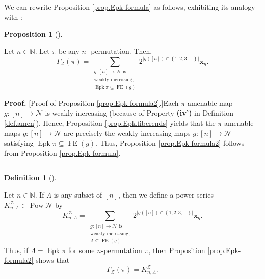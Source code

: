 \documentclass[numbers=enddot,12pt,final,onecolumn,notitlepage]{scrartcl}%
\theoremstyle{definition}
\newtheorem{prop}[theo]{Proposition}
\newenvironment{proposition}[1][]
{\begin{prop}[#1]\begin{leftbar}}
{\end{leftbar}\end{prop}}
\newtheorem{defi}[theo]{Definition}
\newenvironment{definition}[1][]
{\begin{defi}[#1]\begin{leftbar}}
{\end{leftbar}\end{defi}}
\newenvironment{proof}[1][Proof]{\noindent\textbf{#1.} }{\ \rule{0.5em}{0.5em}}
\let\sumnonlimits\sum
\renewcommand{\sum}{\sumnonlimits\limits}
\begin{document}
We can rewrite Proposition \ref{prop.Epk-formula} as follows, exhibiting its
analogy with \cite[Proposition 2.2]{Stembr97}:

\begin{proposition}
\label{prop.Epk-formula2}Let $n\in\mathbb{N}$. Let $\pi$ be any $n$%
-permutation. Then,%
\[
\Gamma_{\mathcal{Z}}\left(  \pi\right)  =\sum_{\substack{g:\left[  n\right]
\rightarrow\mathcal{N}\text{ is}\\\text{weakly increasing;}%
\\\operatorname*{Epk}\pi\subseteq\operatorname*{FE}\left(  g\right)
}}2^{\left\vert g\left(  \left[  n\right]  \right)  \cap\left\{
1,2,3,\ldots\right\}  \right\vert }\mathbf{x}_{g}.
\]

\end{proposition}

\begin{proof}
[Proof of Proposition \ref{prop.Epk-formula2}.]Each $\pi$-amenable map
$g:\left[  n\right]  \rightarrow\mathcal{N}$ is weakly increasing (because of
Property \textbf{(iv')} in Definition \ref{def.amen}). Hence, Proposition
\ref{prop.Epk.fiberends} yields that the $\pi$-amenable maps $g:\left[
n\right]  \rightarrow\mathcal{N}$ are precisely the weakly increasing maps
$g:\left[  n\right]  \rightarrow\mathcal{N}$ satisfying $\operatorname*{Epk}%
\pi\subseteq\operatorname*{FE}\left(  g\right)  $. Thus, Proposition
\ref{prop.Epk-formula2} follows from Proposition \ref{prop.Epk-formula}.
\end{proof}

\begin{definition}
\label{def.KnL}Let $n\in\mathbb{N}$. If $\Lambda$ is any subset of $\left[
n\right]  $, then we define a power series $K_{n,\Lambda}^{\mathcal{Z}}%
\in\operatorname*{Pow}\mathcal{N}$ by%
\begin{equation}
K_{n,\Lambda}^{\mathcal{Z}}=\sum_{\substack{g:\left[  n\right]  \rightarrow
\mathcal{N}\text{ is}\\\text{weakly increasing;}\\\Lambda\subseteq
\operatorname*{FE}\left(  g\right)  }}2^{\left\vert g\left(  \left[  n\right]
\right)  \cap\left\{  1,2,3,\ldots\right\}  \right\vert }\mathbf{x}_{g}.
\label{eq.def.KnL.1}%
\end{equation}
Thus, if $\Lambda=\operatorname*{Epk}\pi$ for some $n$-permutation $\pi$, then
Proposition \ref{prop.Epk-formula2} shows that%
\begin{equation}
\Gamma_{\mathcal{Z}}\left(  \pi\right)  =K_{n,\Lambda}^{\mathcal{Z}}.
\label{eq.def.KnL.2}%
\end{equation}

\end{definition}
\end{document}
